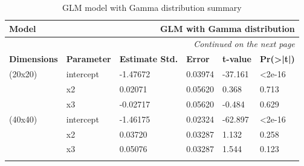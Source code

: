 \documentclass[12pt,a4paper,twoside]{article}
\begin{document}
\newpage

\begin{longtable}{l|p{}|p{}|p{}|p{}|p{}}
    \textbf{Model}      & \multicolumn{5}{r}{GLM with Gamma distribution}                                                                                  \\
    \hline
    \endhead
    \hline
    \multicolumn{6}{r}{\emph{Continued on the next page}}                                                                                                  \\
    \endfoot
    \hline
    \endlastfoot
    \hline
    \textbf{Dimensions} & \textbf{Parameter}                              & \textbf{Estimate Std.} & \textbf{Error} & \textbf{t-value} & \textbf{Pr(>|t|)} \\
    \hline
    (20x20)             & intercept                                       & -1.47672               & 0.03974        & -37.161          & <2e-16            \\
                        & x2                                              & 0.02071                & 0.05620        & 0.368            & 0.713             \\
                        & x3                                              & -0.02717               & 0.05620        & -0.484           & 0.629             \\
    \hline
    (40x40)             & intercept                                       & -1.46175               & 0.02324        & -62.897          & <2e-16            \\
                        & x2                                              & 0.03720                & 0.03287        & 1.132            & 0.258             \\
                        & x3                                              & 0.05076                & 0.03287        & 1.544            & 0.123             \\
    \caption{GLM model with Gamma distribution summary}
    \label{tab:gammasumtab}
\end{longtable}
\end{document}
